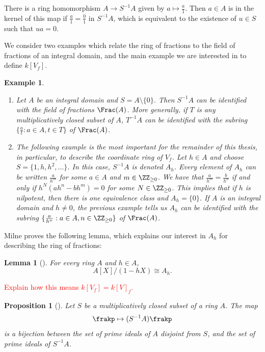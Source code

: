 \documentclass[12pt]{amsart}
\theoremstyle{plain}
\newtheorem{lemma}[theorem]{Lemma}
\newtheorem{proposition}[theorem]{Proposition}
\newtheorem{example}[theorem]{Example}
\begin{document}
There is a ring homomorphism $A\to S^{-1}A$ given by $a \mapsto \frac{a}{1}$.
Then $a\in A$ is in the kernel of this map if $\frac{a}{1}=\frac{0}{1}$ in $S^{-1}A$, which is equivalent to the existence of $u\in S$ such that $u a = 0$.

We consider two examples which relate the ring of fractions to the field of fractions of an integral domain, and the main example we are interested in to define $k[V_f]$.

\begin{example}
\begin{enumerate}
\item
Let $A$ be an integral domain and $S = A \setminus \{0\}$.
Then $S^{-1}A$ can be identified with the field of fractions $\Frac(A)$.
More generally, if $T$ is any multiplicatively closed subset of $A$, $T^{-1}A$ can be identified with the subring $\{\frac{a}{t} : a\in A, t \in T\}$ of $\Frac(A)$.

\item
The following example is the most important for the remainder of this thesis, in particular, to describe the coordinate ring of $V_f$.
Let $h \in A$ and choose $S = \{1, h, h^2, \ldots\}$.
In this case, $S^{-1}A$ is denoted $A_h$.
Every element of $A_h$ can be written $\frac{a}{h^m}$ for some $a \in A$ and $m \in \ZZ_{\ge 0}$.
We have that $\frac{a}{h^m} = \frac{b}{h^n}$ if and only if $h^N (ah^n - b h^m)=0$ for some $N \in \ZZ_{\ge 0}$.
This implies that if $h$ is nilpotent, then there is one equivalence class and $A_h = \{0\}$.
If $A$ is an integral domain and $h \ne 0$, the previous example tells us $A_h$ can be identified with the subring $\{\frac{a}{h^n} : a \in A, n \in \ZZ_{\ge 0}\}$ of $\Frac(A)$.
\end{enumerate}
\end{example}

Milne proves the following lemma, which explains our interest in $A_h$ for describing the ring of fractions:

\begin{lemma}[{\cite[Lemma 1.13]{Milne13}}]
For every ring $A$ and $h \in A$,
$$A[X]/(1-hX) \cong A_h.$$
\end{lemma}

\textcolor{red}{Explain how this means $k[V_f] = k[V]_f$.}

\begin{proposition}[{\cite[Proposition 1.14]{Milne13}}]\label{proposition:localizationideals}
Let $S$ be a multiplicatively closed subset of a ring $A$.
The map
$$\frakp \mapsto (S^{-1}A) \frakp$$
is a bijection between the set of prime ideals of $A$ disjoint from $S$, and the set of prime ideals of $S^{-1}A$.
\end{proposition}
\end{document}
